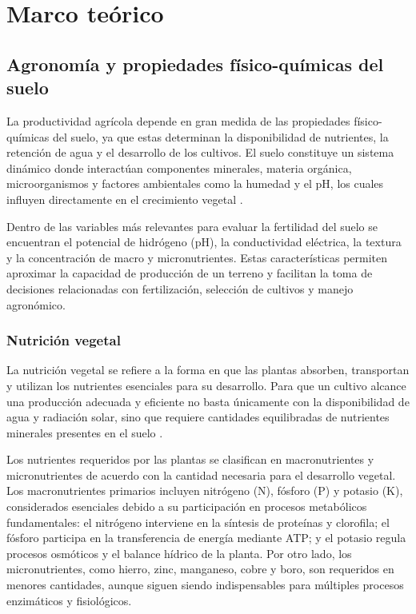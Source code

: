\documentclass[12pt]{article}
\begin{document}
\section{Marco teórico}

\subsection{Agronomía y propiedades físico-químicas del suelo}
La productividad agrícola depende en gran medida de las propiedades físico-químicas del suelo, ya que estas determinan la disponibilidad de nutrientes, la retención de agua y el desarrollo de los cultivos. El suelo constituye un sistema dinámico donde interactúan componentes minerales, materia orgánica, microorganismos y factores ambientales como la humedad y el pH, los cuales influyen directamente en el crecimiento vegetal \citep{weil_brady_2017}.

Dentro de las variables más relevantes para evaluar la fertilidad del suelo se encuentran el potencial de hidrógeno (pH), la conductividad eléctrica, la textura y la concentración de macro y micronutrientes. Estas características permiten aproximar la capacidad de producción de un terreno y facilitan la toma de decisiones relacionadas con fertilización, selección de cultivos y manejo agronómico.

\subsubsection{Nutrición vegetal}
La nutrición vegetal se refiere a la forma en que las plantas absorben, transportan y utilizan los nutrientes esenciales para su desarrollo. Para que un cultivo alcance una producción adecuada y eficiente no basta únicamente con la disponibilidad de agua y radiación solar, sino que requiere cantidades equilibradas de nutrientes minerales presentes en el suelo \citep{weil_brady_2017}.

Los nutrientes requeridos por las plantas se clasifican en macronutrientes y micronutrientes de acuerdo con la cantidad necesaria para el desarrollo vegetal. Los macronutrientes primarios incluyen nitrógeno (N), fósforo (P) y potasio (K), considerados esenciales debido a su participación en procesos metabólicos fundamentales: el nitrógeno interviene en la síntesis de proteínas y clorofila; el fósforo participa en la transferencia de energía mediante ATP; y el potasio regula procesos osmóticos y el balance hídrico de la planta. Por otro lado, los micronutrientes, como hierro, zinc, manganeso, cobre y boro, son requeridos en menores cantidades, aunque siguen siendo indispensables para múltiples procesos enzimáticos y fisiológicos.
\end{document}

